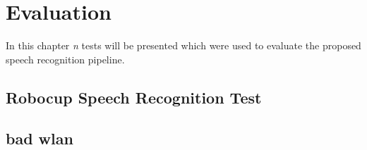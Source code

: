 

\chapter{Evaluation}

In this chapter \textit{n} tests will be presented which were used to evaluate the proposed speech recognition pipeline.

\section{Robocup Speech Recognition Test}

\section{bad wlan}
